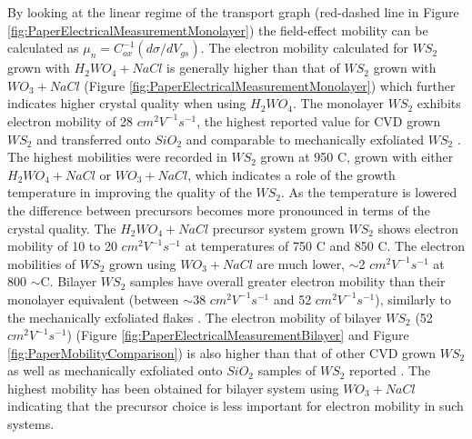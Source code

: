 \documentclass[12pt]{article}
\begin{document}
By looking at the linear regime of the transport graph (red-dashed line in Figure \ref{fig:PaperElectricalMeasurementMonolayer}) the field-effect mobility can be calculated as ${\mu}_n=C_{ox}^{-1}(d{\sigma}/dV_{gs})$. The electron mobility calculated for $WS_2$ grown with $H_2WO_4 + NaCl$ is generally higher than that of $WS_2$ grown with $WO_3 + NaCl$ (Figure \ref{fig:PaperElectricalMeasurementMonolayer}) which further indicates higher crystal quality when using $H_2WO_4$. The monolayer $WS_2$ exhibits electron mobility of 28 $cm^2 V^{-1} s^{-1}$, the highest reported value for CVD grown $WS_2$ and transferred onto $SiO_2$ \cite{Li2015}\cite{Kang2015}\cite{Gao2015}\cite{doi:10.1021/nn403454e}\cite{doi:10.1021/acsnano.5b01480}\cite{Lee2013}\cite{Yun2015}\cite{Alharbi2016}\cite{Lan2015}\cite{Hussain2013}\cite{Cui2015} and comparable to mechanically exfoliated $WS_2$ \cite{Withers2014}\cite{Iqbal2016}\cite{Georgiou2014}\cite{Iqbal2015a}. The highest mobilities were recorded in $WS_2$ grown at 950 {\degree}C, grown with either $H_2WO_4 + NaCl$ or $WO_3 + NaCl$, which indicates a role of the growth temperature in improving the quality of the $WS_2$. As the temperature is lowered the difference between precursors becomes more pronounced in terms of the crystal quality. The $H_2WO_4 + NaCl$ precursor system grown $WS_2$ shows electron mobility of 10 to 20 $cm^2 V^{-1} s^{-1}$ at temperatures of 750 {\degree}C and 850 {\degree}C. The electron mobilities of $WS_2$ grown using $WO_3 + NaCl$ are much lower, {$\sim$}2 $cm^2 V^{-1} s^{-1}$ at 800 $\sim$C. Bilayer $WS_2$ samples have overall greater electron mobility than their monolayer equivalent (between {$\sim$}38 $cm^2 V^{-1} s^{-1}$ and 52 $cm^2 V^{-1} s^{-1}$), similarly to the mechanically exfoliated flakes \cite{Ovchinnikov2014}\cite{Iqbal2015a}. The electron mobility of bilayer $WS_2$ (52 $cm^2 V^{-1} s^{-1}$) (Figure \ref{fig:PaperElectricalMeasurementBilayer} and Figure \ref{fig:PaperMobilityComparison}) is also higher than that of other CVD grown $WS_2$ as well as mechanically exfoliated onto $SiO_2$ samples of $WS_2$ reported  \cite{Iqbal2015}\cite{Ovchinnikov2014}\cite{Iqbal2015a}. The highest mobility has been obtained for bilayer system using $WO_3 + NaCl$ indicating that the precursor choice is less important for electron mobility in such systems. 
\end{document}
